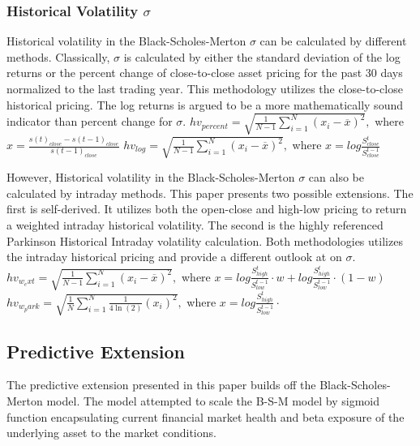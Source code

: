 \documentclass{article}
\begin{document}
\subsubsection {Historical Volatility $\sigma$}
\begin{flushleft} Historical volatility in the Black-Scholes-Merton $\sigma$ can be calculated by different methods. Classically, $\sigma$ is calculated by either the standard deviation of the log returns or the percent change of close-to-close asset pricing for the past 30 days normalized to the last trading year. This methodology utilizes the close-to-close historical pricing. The log returns is argued to be a more mathematically sound indicator than percent change for $\sigma$. 
\newline \newline
$hv_{percent} = \sqrt{\frac{1}{N-1} \sum_{i=1}^N (x_i - \overline{x})^2},$ where $x=\frac{s(t)_{close} - s(t-1)_{close}}{s(t-1)_{close}} $
\newline\newline
$hv_{log} = \sqrt{\frac{1}{N-1} \sum_{i=1}^N (x_i - \overline{x})^2},$ where $x=log{\frac{S^t_{close}}{ S^{t-1}_{close}}}$
\end{flushleft}
\begin{flushleft} However, Historical volatility in the Black-Scholes-Merton $\sigma$ can also be calculated by intraday methods. This paper presents two possible extensions. The first is self-derived. It utilizes both the open-close and high-low pricing to return a weighted intraday historical volatility. The second is the highly referenced Parkinson Historical Intraday volatility calculation. Both methodologies utilizes the intraday historical pricing and provide a different outlook at on $\sigma$. 
\newline \newline
$hv_{w_ext} = \sqrt{\frac{1}{N-1} \sum_{i=1}^N (x_i - \overline{x})^2},$ where $x=log{\frac{S^t_{high}}{ S^{t-1}_{low}}} \cdot w + log{\frac{S^t_{high}}{ S^{t-1}_{low}}} \cdot (1-w)$
\newline\newline
$hv_{w_park} = \sqrt{\frac{1}{N} \sum_{i=1}^N \frac{1}{4\ln(2)}(x_i )^2},$ where $ x=log{\frac{S^t_{high}}{ S^{t-1}_{low}}} \cdot $
\end{flushleft}

\subsection{Predictive Extension}
\begin{flushleft}
The predictive extension presented in this paper builds off the Black-Scholes-Merton model. The model attempted to scale the B-S-M model by sigmoid function encapsulating current financial market health and beta exposure of the underlying asset to the market conditions.
\end{flushleft}
\end{document}

